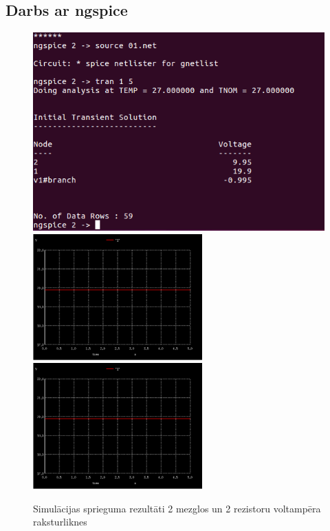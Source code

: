 \documentclass{report}
\begin{document}
\subsection{Darbs ar ngspice}
\begin{figure}[!h]
\includegraphics[width=13cm]{results.png}
\includegraphics[width=6.5cm]{01.png}
\includegraphics[width=6.5cm]{01.png}
\caption{Simulācijas sprieguma rezultāti 2 mezglos un 2 rezistoru voltampēra raksturliknes}
\end{figure}
\end{document}
